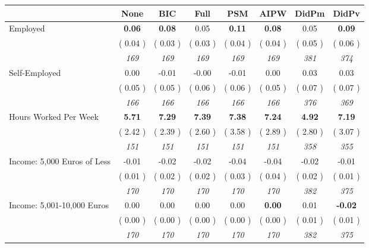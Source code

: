 \begin{tabular}{l c c c c c c c}
\toprule
 & None & BIC & Full & PSM & AIPW & DidPm & DidPv \\
\midrule
Employed & \textbf{      0.06 } & \textbf{      0.08 } &      0.05 & \textbf{     0.11} & \textbf{     0.08} &      0.05 & \textbf{      0.09 } \\
& (     0.04 ) & (     0.03 ) & (     0.03 ) & (     0.04 ) & (     0.04 ) & (     0.05 ) & (     0.06 ) \\
& \textit{ 169 } & \textit{ 169 } & \textit{ 169 } & \textit{ 169 } & \textit{ 169 } & \textit{ 381 } & \textit{ 374 } \\
Self-Employed &      0.00 &     -0.01 &     -0.00 &     -0.01 &      0.00 &      0.03 &      0.03 \\
& (     0.05 ) & (     0.05 ) & (     0.06 ) & (     0.06 ) & (     0.05 ) & (     0.07 ) & (     0.07 ) \\
& \textit{ 166 } & \textit{ 166 } & \textit{ 166 } & \textit{ 166 } & \textit{ 166 } & \textit{ 376 } & \textit{ 369 } \\
Hours Worked Per Week & \textbf{      5.71 } & \textbf{      7.29 } & \textbf{      7.39 } & \textbf{     7.38} & \textbf{     7.24} & \textbf{      4.92 } & \textbf{      7.19 } \\
& (     2.42 ) & (     2.39 ) & (     2.60 ) & (     3.58 ) & (     2.89 ) & (     2.80 ) & (     3.07 ) \\
& \textit{ 151 } & \textit{ 151 } & \textit{ 151 } & \textit{ 151 } & \textit{ 151 } & \textit{ 358 } & \textit{ 355 } \\
Income: 5,000 Euros of Less &     -0.01 &     -0.02 &     -0.02 &     -0.04 &     -0.04 &     -0.02 &     -0.01 \\
& (     0.01 ) & (     0.02 ) & (     0.02 ) & (     0.03 ) & (     0.04 ) & (     0.02 ) & (     0.01 ) \\
& \textit{ 170 } & \textit{ 170 } & \textit{ 170 } & \textit{ 170 } & \textit{ 170 } & \textit{ 382 } & \textit{ 375 } \\
Income: 5,001-10,000 Euros &      0.00 &      0.00 &      0.00 &      0.00 & \textbf{     0.00} &      0.01 & \textbf{     -0.02 } \\
& (     0.00 ) & (     0.00 ) & (     0.00 ) & (     0.00 ) & (     0.00 ) & (     0.01 ) & (     0.01 ) \\
& \textit{ 170 } & \textit{ 170 } & \textit{ 170 } & \textit{ 170 } & \textit{ 170 } & \textit{ 382 } & \textit{ 375 } \\

\end{tabular}
